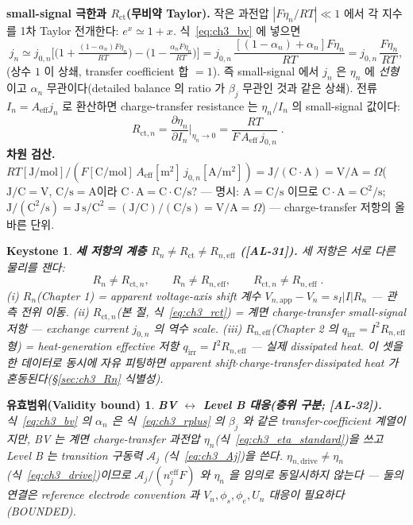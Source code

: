 \documentclass[11pt,a4paper]{article}
\newtheorem*{boundbox}{유효범위(Validity bound)}
\newtheorem*{keybox}{Keystone}
\newcommand{\eff}{\mathrm{eff}}
\newcommand{\app}{\mathrm{app}}
\newcommand{\drive}{\mathrm{drive}}
\newcommand{\irr}{\mathrm{irr}}
\newcommand{\ct}{\mathrm{ct}}
\newcommand{\AL}[1]{\textsf{[AL-#1]}}
\begin{document}
\textbf{small-signal 극한과 $R_\ct$(무비약 Taylor).} 작은 과전압 $|F\eta_n/RT|\ll1$ 에서 각 지수를 1차 Taylor
전개한다: $e^{x}\simeq1+x$. 식~\eqref{eq:ch3_bv} 에 넣으면
\begin{equation}
j_n\simeq j_{0,n}\Big[\big(1+\tfrac{(1-\alpha_n)F\eta_n}{RT}\big)-\big(1-\tfrac{\alpha_n F\eta_n}{RT}\big)\Big]
=j_{0,n}\,\frac{[(1-\alpha_n)+\alpha_n]F\eta_n}{RT}=j_{0,n}\,\frac{F\eta_n}{RT},
\label{eq:ch3_bv_linear}
\end{equation}
(상수 $1$ 이 상쇄, transfer coefficient 합 $=1$). 즉 small-signal 에서 $j_n$ 은 $\eta_n$ 에 \emph{선형}이고
$\alpha_n$ 무관이다(detailed balance 의 ratio 가 $\beta_j$ 무관인 것과 같은 상쇄). 전류 $I_n=A_\eff j_n$ 로
환산하면 charge-transfer resistance 는 $\eta_n/I_n$ 의 small-signal 값이다:
\begin{equation}
\boxed{\;R_{\ct,n}=\frac{\partial\eta_n}{\partial I_n}\Big|_{\eta_n\to0}=\frac{RT}{F\,A_\eff\,j_{0,n}}\;.}
\label{eq:ch3_rct}
\end{equation}
\textbf{차원 검산.} $RT[\mathrm{J/mol}]/(F[\mathrm{C/mol}]\,A_\eff[\mathrm{m^2}]\,j_{0,n}[\mathrm{A/m^2}])
=\mathrm{J}/(\mathrm{C}\cdot\mathrm{A})=\mathrm{V/A}=\Omega$($\mathrm{J/C}=\mathrm V$, $\mathrm{C/s}=\mathrm A$이라
$\mathrm{C}\cdot\mathrm{A}=\mathrm{C}\cdot\mathrm{C/s}$? — 명시: $\mathrm{A}=\mathrm{C/s}$ 이므로
$\mathrm{C\cdot A}=\mathrm{C^2/s}$; $\mathrm J/(\mathrm{C^2/s})=\mathrm{J\,s/C^2}=(\mathrm{J/C})/(\mathrm{C/s})
=\mathrm{V/A}=\Omega$) — charge-transfer 저항의 올바른 단위.
\begin{keybox}
\textbf{세 저항의 계층 $R_n\ne R_\ct\ne R_{n,\eff}$ (\AL{31}).} 세 저항은 \emph{서로 다른 물리}를 잰다:
\begin{equation}
\boxed{\;R_n\ne R_{\ct,n},\qquad R_n\ne R_{n,\eff},\qquad R_{\ct,n}\ne R_{n,\eff}\;.}
\label{eq:ch3_Rn_not_equal}
\end{equation}
(i) $R_n$(Chapter 1) = apparent \emph{voltage-axis shift} 계수 $V_{n,\app}-V_n=s_I|I|R_n$ — 관측 전위 이동.
(ii) $R_{\ct,n}$(본 절, 식~\eqref{eq:ch3_rct}) = 계면 \emph{charge-transfer} small-signal 저항 — exchange
current $j_{0,n}$ 의 역수 scale. (iii) $R_{n,\eff}$(Chapter 2 의 $q_\irr=I^2R_{n,\eff}$ 형) = \emph{heat-generation}
effective 저항 $q_\irr=I^2R_{n,\eff}$ — 실제 dissipated heat. 이 셋을 한 데이터로 동시에 자유 피팅하면 apparent
shift$\cdot$charge-transfer$\cdot$dissipated heat 가 혼동된다(\S\ref{sec:ch3_Rn} 식별성).
\end{keybox}
\begin{boundbox}
\textbf{BV $\leftrightarrow$ Level B 대응(층위 구분; \AL{32}).} 식~\eqref{eq:ch3_bv} 의 $\alpha_n$ 은
식~\eqref{eq:ch3_rplus} 의 $\beta_j$ 와 같은 transfer-coefficient 계열이지만, BV 는 \emph{계면 charge-transfer}
과전압 $\eta_n$(식~\eqref{eq:ch3_eta_standard})을 쓰고 Level B 는 \emph{transition} 구동력 $\mathcal A_j$
(식~\eqref{eq:ch3_Aj})을 쓴다. $\eta_{n,\drive}\ne\eta_n$(식~\eqref{eq:ch3_drive})이므로 $\mathcal A_j/(n_j^\eff F)$
와 $\eta_n$ 을 임의로 동일시하지 않는다 — 둘의 연결은 reference electrode convention 과 $V_n,\phi_s,\phi_e,U_n$
대응이 필요하다(BOUNDED).
\end{boundbox}
\end{document}
